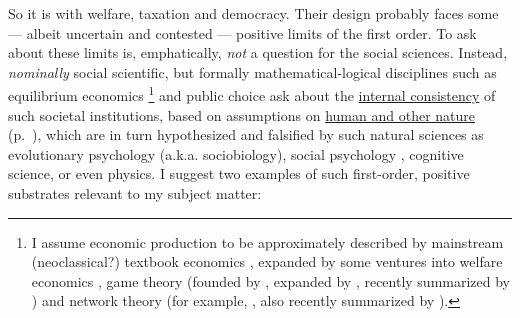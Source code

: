 So it is with welfare, taxation and democracy.
Their design probably faces some --- albeit uncertain and contested --- positive limits of the first order.
To ask about these limits is, emphatically, \emph{not} a question for the social sciences.
Instead, \emph{nominally} social scientific, but formally mathematical-logical disciplines such as equilibrium economics
\footnote{
	I assume economic production to be approximately described by mainstream (neoclassical?) textbook economics \citep[including][]{Mankiw-2004-aa,FrankBernanke2004}, expanded by some ventures into welfare economics \citep{Hicks1939,Samuelson-1954-eu},  game theory (founded by \citealt{VonNeumannMorgenstern1944,Nash1951},  expanded by \citealt{Axelrod1981a}, recently summarized by \citealt{Kleinberg-2009-oz}) and network theory (for example, \citealt{Mandelbrot2004}, \citealt{Jackson1968} also recently summarized by \citealt{Kleinberg-2009-oz}).
}
and public choice ask about the \hyperref[itm:internal-consistency]{internal consistency} of such societal institutions, based on assumptions on \hyperref[itm:a-posteriori]{human and other nature} (p.~\pageref{itm:a-posteriori}), which are in turn hypothesized and falsified by such natural sciences as evolutionary psychology (a.k.a. sociobiology), social psychology \citep[initially][]{KahnemanTversky1979}, cognitive science, or even physics.
I suggest two examples of such first-order, positive substrates relevant to my subject matter:
